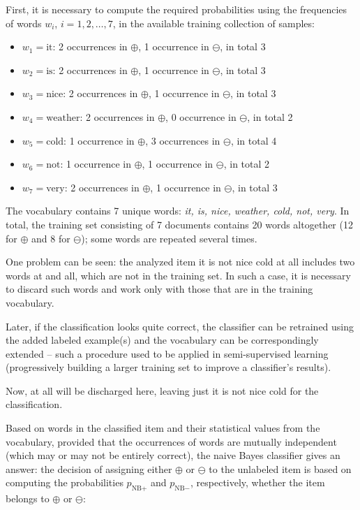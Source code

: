 First, it is necessary to compute the required probabilities using the frequencies of words $w_i$, $i = 1,2,\dots,7$, in the available training collection of samples:


\begin{itemize}
\renewcommand{\labelitemi}{}
    \item $w_1 = \text{it}$: 2 occurrences in $\oplus$, 1 occurrence in $\ominus$, in total 3
    \item $w_2 = \text{is}$: 2 occurrences in $\oplus$, 1 occurrence in $\ominus$, in total 3
    \item $w_3 = \text{nice}$: 2 occurrences in $\oplus$, 1 occurrence in $\ominus$, in total 3
    \item $w_4 = \text{weather}$: 2 occurrences in $\oplus$, 0 occurrence in $\ominus$, in total 2
    \item $w_5 = \text{cold}$: 1 occurrence in $\oplus$, 3 occurrences in $\ominus$, in total 4
    \item $w_6 = \text{not}$: 1 occurrence in $\oplus$, 1 occurrence in $\ominus$, in total 2
    \item $w_7 = \text{very}$: 2 occurrences in $\oplus$, 1 occurrence in $\ominus$, in total 3
\end{itemize}

The vocabulary contains 7 unique words: \textit{it, is, nice, weather, cold, not, very}. 
In total, the training set consisting of 7 documents contains 20 words altogether 
(12 for $\oplus$ and 8 for $\ominus$); some words are repeated several times.


One problem can be seen: the analyzed item it is not nice cold at all includes
two words at and all, which are not in the training set. In such a case, it is necessary to discard such words and work only with those that are in the training
vocabulary.

Later, if the classification looks quite correct, the classifier can be retrained
using the added labeled example(s) and the vocabulary can be correspondingly
extended – such a procedure used to be applied in semi-supervised learning (progressively building a larger training set to improve a classifier’s results).

Now, at all will be discharged here, leaving just it is not nice cold for the
classification.

Based on words in the classified item and their statistical values from the 
vocabulary, provided that the occurrences of words are mutually independent 
(which may or may not be entirely correct), the naive Bayes classifier gives an answer: 
the decision of assigning either $\oplus$ or $\ominus$ to the unlabeled item is based on 
computing the probabilities $p_{\text{NB}+}$ and $p_{\text{NB}-}$, respectively, 
whether the item belongs to $\oplus$ or $\ominus$:

